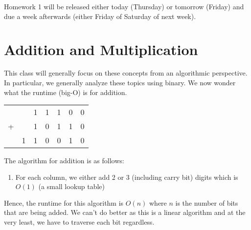 \documentclass[14pt]{extarticle}
\begin{document}
	\MakeScribeTop

    Homework 1 will be released either today (Thursday) or tomorrow (Friday)
    and due a week afterwards (either Friday of Saturday of next week).

    \section{Addition and Multiplication}
    This class will generally focus on these concepts from an algorithmic 
    perspective. In particular, we generally analyze these topics using
    binary. We now wonder what the runtime (big-O) is for addition.\\
    \begin{center}
        \begin{tabular}{ccccccc}
          && 1 & 1 & 1 & 0 & 0 \\
         +&& 1 & 0 & 1 & 1 & 0\\
        \hline
          & 1 & 1 & 0 & 0 & 1 & 0
        \end{tabular}
    \end{center}
    The algorithm for addition is as follows:
    \begin{enumerate}
        \item For each column, we either add 2 or 3 (including carry bit)
            digits which is $O(1)$ (a small lookup table)
    \end{enumerate}
    Hence, the runtime for this algorithm is $O(n)$ where $n$ is the number
    of bits that are being added. We can't do better as this is a linear 
    algorithm and at the very least, we have to traverse each bit regardless.\\
\end{document}
